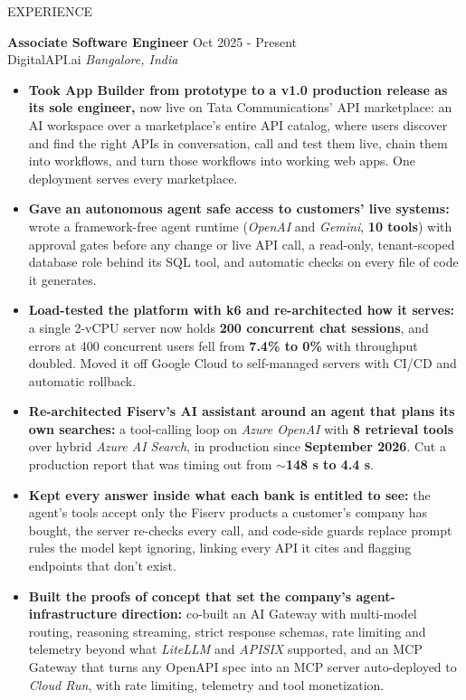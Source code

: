 \documentclass{resume} %
\begin{document}
\begin{rSection}{EXPERIENCE}

\textbf{Associate Software Engineer} \hfill Oct 2025 - Present\\
DigitalAPI.ai \hfill \textit{Bangalore, India}
 \begin{itemize}
    \itemsep -3pt {} 
     \item \textbf{Took App Builder from prototype to a v1.0 production release as its sole engineer,} now live on Tata Communications' API marketplace: an AI workspace over a marketplace's entire API catalog, where users discover and find the right APIs in conversation, call and test them live, chain them into workflows, and turn those workflows into working web apps. One deployment serves every marketplace.
     \item \textbf{Gave an autonomous agent safe access to customers' live systems:} wrote a framework-free agent runtime (\textit{OpenAI} and \textit{Gemini}, \textbf{10 tools}) with approval gates before any change or live API call, a read-only, tenant-scoped database role behind its SQL tool, and automatic checks on every file of code it generates.
     \item \textbf{Load-tested the platform with k6 and re-architected how it serves:} a single 2-vCPU server now holds \textbf{200 concurrent chat sessions}, and errors at 400 concurrent users fell from \textbf{7.4\% to 0\%} with throughput doubled. Moved it off Google Cloud to self-managed servers with CI/CD and automatic rollback.
     \item \textbf{Re-architected Fiserv's AI assistant around an agent that plans its own searches:} a tool-calling loop on \textit{Azure OpenAI} with \textbf{8 retrieval tools} over hybrid \textit{Azure AI Search}, in production since \textbf{September 2026}. Cut a production report that was timing out from \textbf{$\sim$148 s to 4.4 s}.
     \item \textbf{Kept every answer inside what each bank is entitled to see:} the agent's tools accept only the Fiserv products a customer's company has bought, the server re-checks every call, and code-side guards replace prompt rules the model kept ignoring, linking every API it cites and flagging endpoints that don't exist.
     \item \textbf{Built the proofs of concept that set the company's agent-infrastructure direction:} co-built an AI Gateway with multi-model routing, reasoning streaming, strict response schemas, rate limiting and telemetry beyond what \textit{LiteLLM} and \textit{APISIX} supported, and an MCP Gateway that turns any OpenAPI spec into an MCP server auto-deployed to \textit{Cloud Run}, with rate limiting, telemetry and tool monetization.
 \end{itemize}


\end{rSection}
\end{document}
